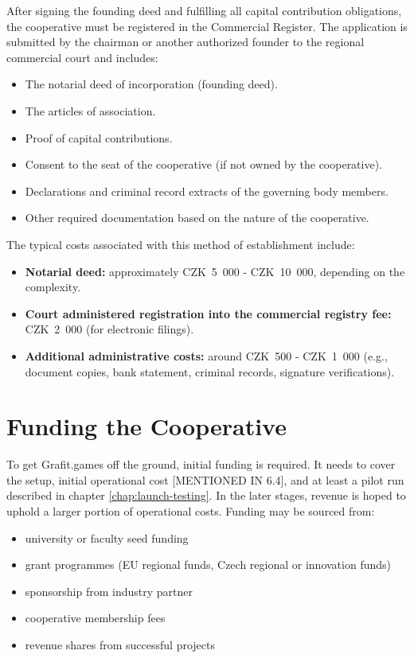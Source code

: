 After signing the founding deed and fulfilling all capital contribution obligations, the cooperative must be registered in the Commercial Register. The application is submitted by the chairman or another authorized founder to the regional commercial court and includes:
\begin{itemize}
    \item The notarial deed of incorporation (founding deed).
    \item The articles of association.
    \item Proof of capital contributions.
    \item Consent to the seat of the cooperative (if not owned by the cooperative).
    \item Declarations and criminal record extracts of the governing body members.
    \item Other required documentation based on the nature of the cooperative.
\end{itemize}
The typical costs associated with this method of establishment include:
\begin{itemize}
    \item \textbf{Notarial deed:} approximately CZK~5~000 - CZK~10~000, depending on the complexity.
    \item \textbf{Court administered registration into the commercial registry fee:} CZK~2~000 (for electronic filings).
    \item \textbf{Additional administrative costs:} around CZK~500 - CZK~1~000 (e.g., document copies, bank statement, criminal records, signature verifications).
\end{itemize}

\section{Funding the Cooperative}
To get Grafit.games off the ground, initial funding is required. It needs to cover the setup, initial operational cost [MENTIONED IN 6.4], and at least a pilot run described in chapter \ref{chap:launch-testing}. In the later stages, revenue is hoped to uphold a larger portion of operational costs. Funding may be sourced from:
\begin{itemize}
    \item university or faculty seed funding
    \item grant programmes (EU regional funds, Czech regional or innovation funds)
    \item sponsorship from industry partner
    \item cooperative membership fees
    \item revenue shares from successful projects
\end{itemize}

